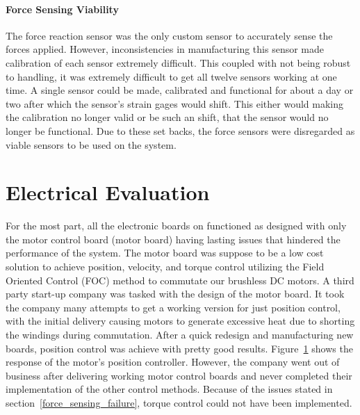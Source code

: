\begin{appendices}
\paragraph{Force Sensing Viability}
The force reaction sensor was the only custom sensor to accurately sense the forces applied.
However, inconsistencies in manufacturing this sensor made calibration of each sensor extremely difficult.
This coupled with not being robust to handling, it was extremely difficult to get all twelve sensors working at one time.
A single sensor could be made, calibrated and functional for about a day or two after which the sensor's strain gages would shift.
This either would making the calibration no longer valid or be such an shift, that the sensor would no longer be functional.
Due to these set backs, the force sensors were disregarded as viable sensors to be used on the system.

\section{Electrical Evaluation}

For the most part, all the electronic boards on \SB{} functioned as designed with only the motor control board (motor board) having lasting issues that hindered the performance of the system.
The motor board was suppose to be a low cost solution to achieve position, velocity, and torque control utilizing the Field Oriented Control (FOC) method to commutate our brushless DC motors.
A third party start-up company was tasked with the design of the motor board.
It took the company many attempts to get a working version for just position control, with the initial delivery causing motors to generate excessive heat due to shorting the windings during commutation.
After a quick redesign and manufacturing new boards, position control was achieve with pretty good results.
Figure~\ref{} shows the response of the motor's position controller.
However, the company went out of business after delivering working motor control boards and never completed their implementation of the other control methods.
Because of the issues stated in section~\ref{force_sensing_failure}, torque control could not have been implemented.


\end{appendices}

